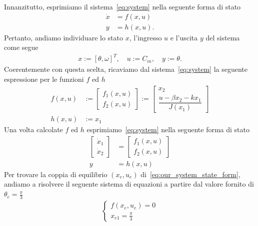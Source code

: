 \documentclass[a4paper, 11pt]{article}
\begin{document}
Innanzitutto, esprimiamo il sistema~\eqref{eq:system} nella seguente forma di stato
%
\begin{subequations}
\begin{align}\label{eq:state_form}
	\dot{x} &= f(x,u)
	\\
	y &= h(x,u).
\end{align}
\end{subequations}
%
Pertanto, andiamo individuare lo stato $x$, l'ingresso $u$ e l'uscita $y$ del sistema come segue 
%
\begin{align*}
	x := \left [ \theta, \omega \right ]^T, \quad u := C_m , \quad y := \theta.
\end{align*}
%
Coerentemente con questa scelta, ricaviamo dal sistema~\eqref{eq:system} la seguente espressione per le funzioni $f$ ed $h$
%
\begin{align}
	f(x,u) &:= 
	\begin{bmatrix}
		f_1(x,u)
		\\[0.5em] 
		f_2(x,u)
	\end{bmatrix} :=
	\begin{bmatrix}
		x_2
		\\[0.5em] 
		\dfrac{u - \beta x_2 - kx_1}{J(x_1)}
	\end{bmatrix}
	\\[0.5em] 
	h(x,u) &:= x_1
\end{align}
%
Una volta calcolate $f$ ed $h$ esprimiamo~\eqref{eq:system} nella seguente forma di stato
%
\begin{subequations}\label{eq:our_system_state_form}
\begin{align}
	\begin{bmatrix}
		\dot{x}_1
		\\
		\dot{x}_2
	\end{bmatrix} &= 
	\begin{bmatrix}
		f_1(x,u)
		\\[0.5em] 
		f_2(x,u)
	\end{bmatrix}\label{eq:state_form_1}
	\\[0.5em]
	y &= h(x, u)
\end{align}
\end{subequations}
%
Per trovare la coppia di equilibrio $(x_e, u_e)$ di~\eqref{eq:our_system_state_form}, andiamo a risolvere il seguente sistema di equazioni a partire dal valore fornito di $\theta_e=\frac{\pi}{3}$
%
\begin{align}
	\left\{\begin{matrix}
		f(x_e, u_e)=0  
		\\[0.5em]
		x_{e1} = \frac{\pi}{3}
	\end{matrix}\right.
\end{align}
\end{document}
